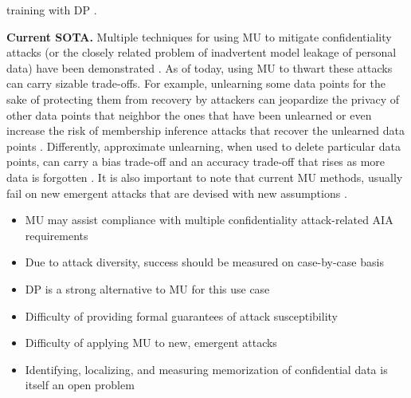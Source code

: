 training with DP \citep{WANG2023408, kaissis2023boundingdatareconstructionattacks}.

\textbf{Current SOTA.} Multiple techniques for using MU to mitigate confidentiality attacks (or the closely related problem of inadvertent model leakage of personal data) have been demonstrated \citep{dhingra2024protecting, ashuach2024revsunlearningsensitiveinformation, lizzo2024unlearnefficientremovalknowledge, chen2024, Wang_2024, CaoYang2015, DBLP:conf/sp/BourtouleCCJTZL21, Borkar}.
As of today, using MU to thwart these attacks can carry sizable trade-offs. For example, unlearning some data points for the sake of protecting them from recovery by attackers can jeopardize the privacy of other data points that neighbor the ones that have been unlearned \citet{carlini2022privacyonioneffectmemorization} or even increase the risk of membership inference attacks that recover the unlearned data points \citet{Chen_2021, barez2025openproblemsmachineunlearning,kurmanji2023unboundedmachineunlearning}. Differently, approximate unlearning, when used to delete particular data points, can carry a bias trade-off \citep{zhang2023forgotten, oesterling2024fairmachineunlearningdata} and an accuracy trade-off that rises as more data is forgotten \citep{Graves_Nagisetty_Ganesh_2021, maini2024tofutaskfictitiousunlearning}. It is also important to note that current MU methods, usually fail on new emergent attacks that are devised with new assumptions \citep{zhang2024doesmureallyforgets, hu2024joggingmumemory}.

\begin{tcolorbox}[colback=green!10,colframe=black!50,title=Key Points]
\begin{itemize}[leftmargin=0pt]
    \item MU may assist compliance with multiple confidentiality attack-related AIA requirements
    \item Due to attack diversity, success should be measured on case-by-case basis
    \item DP is a strong alternative to MU for this use case
\end{itemize}
\end{tcolorbox}

\begin{tcolorbox}[colback=red!10,colframe=black!50,title=Open Problems]
\begin{itemize}[leftmargin=0pt]
    \item Difficulty of providing formal guarantees of attack susceptibility 
    \item  Difficulty of applying MU to new, emergent attacks
    \item Identifying, localizing, and measuring memorization of confidential data is itself an open problem
\end{itemize}
\end{tcolorbox}

